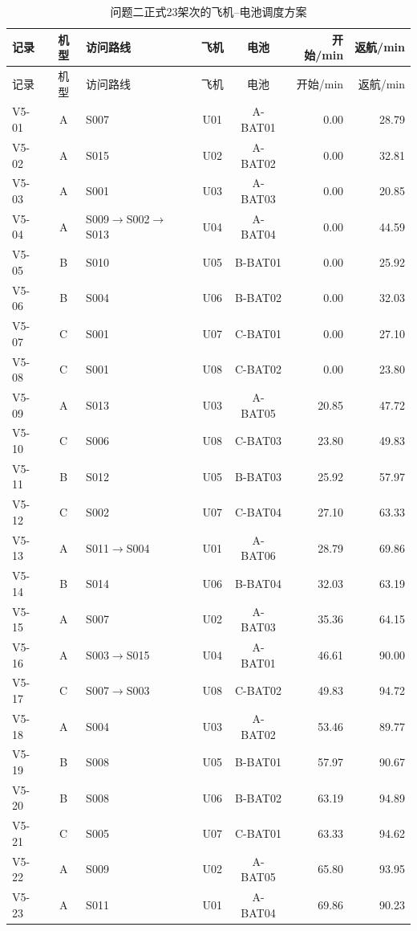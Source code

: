 \documentclass[UTF8,a4paper,12pt]{ctexart}
\begin{document}
\scriptsize
\begin{longtable}{lcp{3.1cm}ccrr}
\caption{问题二正式23架次的飞机--电池调度方案}\label{tab:q2_schedule_main}\\
\toprule
记录 & 机型 & 访问路线 & 飞机 & 电池 & 开始/min & 返航/min\\
\midrule
\endfirsthead
\toprule
记录 & 机型 & 访问路线 & 飞机 & 电池 & 开始/min & 返航/min\\
\midrule
\endhead
V5-01 & A & S007 & U01 & A-BAT01 & 0.00 & 28.79\\
V5-02 & A & S015 & U02 & A-BAT02 & 0.00 & 32.81\\
V5-03 & A & S001 & U03 & A-BAT03 & 0.00 & 20.85\\
V5-04 & A & S009$\to$S002$\to$S013 & U04 & A-BAT04 & 0.00 & 44.59\\
V5-05 & B & S010 & U05 & B-BAT01 & 0.00 & 25.92\\
V5-06 & B & S004 & U06 & B-BAT02 & 0.00 & 32.03\\
V5-07 & C & S001 & U07 & C-BAT01 & 0.00 & 27.10\\
V5-08 & C & S001 & U08 & C-BAT02 & 0.00 & 23.80\\
V5-09 & A & S013 & U03 & A-BAT05 & 20.85 & 47.72\\
V5-10 & C & S006 & U08 & C-BAT03 & 23.80 & 49.83\\
V5-11 & B & S012 & U05 & B-BAT03 & 25.92 & 57.97\\
V5-12 & C & S002 & U07 & C-BAT04 & 27.10 & 63.33\\
V5-13 & A & S011$\to$S004 & U01 & A-BAT06 & 28.79 & 69.86\\
V5-14 & B & S014 & U06 & B-BAT04 & 32.03 & 63.19\\
V5-15 & A & S007 & U02 & A-BAT03 & 35.36 & 64.15\\
V5-16 & A & S003$\to$S015 & U04 & A-BAT01 & 46.61 & 90.00\\
V5-17 & C & S007$\to$S003 & U08 & C-BAT02 & 49.83 & 94.72\\
V5-18 & A & S004 & U03 & A-BAT02 & 53.46 & 89.77\\
V5-19 & B & S008 & U05 & B-BAT01 & 57.97 & 90.67\\
V5-20 & B & S008 & U06 & B-BAT02 & 63.19 & 94.89\\
V5-21 & C & S005 & U07 & C-BAT01 & 63.33 & 94.62\\
V5-22 & A & S009 & U02 & A-BAT05 & 65.80 & 93.95\\
V5-23 & A & S011 & U01 & A-BAT04 & 69.86 & 90.23\\
\bottomrule
\end{longtable}
\normalsize
\end{document}
